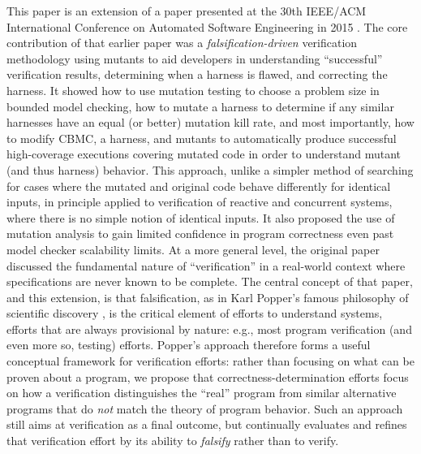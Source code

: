 \documentclass{svjour3}
\begin{document}
This paper is an extension of a paper presented at the 30th IEEE/ACM
International Conference on Automated Software Engineering in 2015
\cite{ase15}.  
The core contribution of that earlier paper was a \emph{falsification-driven}
verification methodology using mutants to aid developers 
 in understanding ``successful'' verification
results, determining when a harness is flawed, and correcting the harness.
It showed how to use mutation testing to
choose a problem size in bounded model checking, how to mutate a
harness to determine if any similar harnesses have an equal (or
better) mutation kill rate, and most importantly, how to modify CBMC,
a harness, and mutants to automatically produce successful
 high-coverage executions covering mutated code in order to
understand mutant (and thus harness) behavior.  This
approach, unlike a simpler method of searching for cases where the
mutated and original code behave differently for identical inputs,
in principle applied to verification of reactive and concurrent systems, where
there is no simple notion of identical inputs.  
It also proposed the use of mutation analysis to gain limited confidence
in program correctness even past model checker scalability limits. 
At a more general level, the original paper discussed the fundamental nature of
``verification'' in a real-world context where specifications are
never known to be complete.  The central concept of that paper, and
this extension, is that falsification, as in Karl
Popper's famous philosophy of scientific discovery \cite{Popper}, is
the critical element of efforts to understand systems, efforts that are always
provisional by nature:  e.g., most program verification (and even more
so, testing) efforts.  Popper's approach therefore forms a 
useful conceptual
framework for verification efforts: rather than focusing on what can
be proven about a program, we propose that correctness-determination efforts focus on how a
verification distinguishes the ``real'' program from similar
alternative programs that do \emph{not} match the theory of program
behavior.  Such an approach still aims at verification as a final outcome, but continually
evaluates and refines that verification effort by its ability to
\emph{falsify} rather than to verify.
\end{document}
